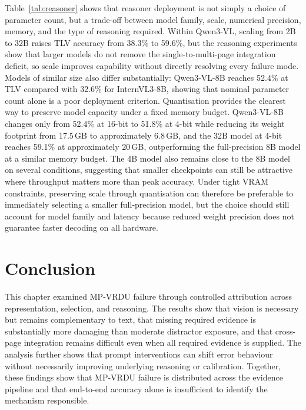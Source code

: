 

Table~\ref{tab:reasoner} shows that reasoner deployment is not simply a choice of parameter count, but a trade-off between model family, scale, numerical precision, memory, and the type of reasoning required. Within Qwen3-VL, scaling from 2B to 32B raises TLV accuracy from 38.3\% to 59.6\%, but the reasoning experiments show that larger models do not remove the single-to-multi-page integration deficit, so scale improves capability without directly resolving every failure mode. Models of similar size also differ substantially: Qwen3-VL-8B reaches 52.4\% at TLV compared with 32.6\% for InternVL3-8B, showing that nominal parameter count alone is a poor deployment criterion. Quantisation provides the clearest way to preserve model capacity under a fixed memory budget. Qwen3-VL-8B changes only from 52.4\% at 16-bit to 51.8\% at 4-bit while reducing its weight footprint from 17.5\,GB to approximately 6.8\,GB, and the 32B model at 4-bit reaches 59.1\% at approximately 20\,GB, outperforming the full-precision 8B model at a similar memory budget. The 4B model also remains close to the 8B model on several conditions, suggesting that smaller checkpoints can still be attractive where throughput matters more than peak accuracy. Under tight VRAM constraints, preserving scale through quantisation can therefore be preferable to immediately selecting a smaller full-precision model, but the choice should still account for model family and latency because reduced weight precision does not guarantee faster decoding on all hardware.


\section{Conclusion}
\label{sec:emp-conc}

This chapter examined MP-VRDU failure through controlled attribution across representation, selection, and reasoning. The results show that vision is necessary but remains complementary to text, that missing required evidence is substantially more damaging than moderate distractor exposure, and that cross-page integration remains difficult even when all required evidence is supplied. The analysis further shows that prompt interventions can shift error behaviour without necessarily improving underlying reasoning or calibration. Together, these findings show that MP-VRDU failure is distributed across the evidence pipeline and that end-to-end accuracy alone is insufficient to identify the mechanism responsible.